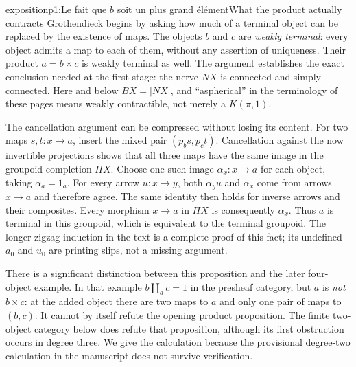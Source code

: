 \begin{dcomment}{exposition}{p1:Le fait que $b$ soit un plus grand élément}{What the product actually contracts}
Grothendieck begins by asking how much of a terminal object can be replaced by the existence of maps. The objects $b$ and $c$ are \emph{weakly terminal}: every object admits a map to each of them, without any assertion of uniqueness. Their product $a=b\times c$ is weakly terminal as well. The argument establishes the exact conclusion needed at the first stage: the nerve $NX$ is connected and simply connected. Here and below $BX=|NX|$, and ``aspherical'' in the terminology of these pages means weakly contractible, not merely a $K(\pi,1)$.

The cancellation argument can be compressed without losing its content. For two maps $s,t:x\to a$, insert the mixed pair $(p_bs,p_ct)$. Cancellation against the now invertible projections shows that all three maps have the same image in the groupoid completion $\Pi X$. Choose one such image $\alpha_x:x\to a$ for each object, taking $\alpha_a=1_a$. For every arrow $u:x\to y$, both $\alpha_yu$ and $\alpha_x$ come from arrows $x\to a$ and therefore agree. The same identity then holds for inverse arrows and their composites. Every morphism $x\to a$ in $\Pi X$ is consequently $\alpha_x$. Thus $a$ is terminal in this groupoid, which is equivalent to the terminal groupoid. The longer zigzag induction in the text is a complete proof of this fact; its undefined $a_0$ and $u_0$ are printing slips, not a missing argument.

There is a significant distinction between this proposition and the later four-object example. In that example $b\amalg_a c=1$ in the presheaf category, but $a$ is \emph{not} $b\times c$: at the added object there are two maps to $a$ and only one pair of maps to $(b,c)$. It cannot by itself refute the opening product proposition. The finite two-object category below does refute that proposition, although its first obstruction occurs in degree three. We give the calculation because the provisional degree-two calculation in the manuscript does not survive verification.
\end{dcomment}

